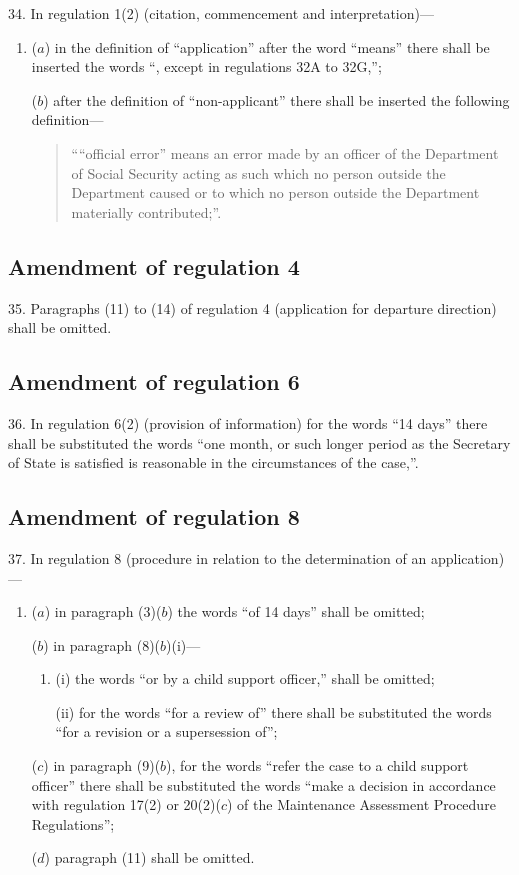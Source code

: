 \documentclass[12pt,a4paper]{article}
\begin{document}
34.  In regulation 1(2) (citation, commencement and interpretation)---
\begin{enumerate}\item[]
($a$) in the definition of “application” after the word “means” there shall be inserted the words “, except in regulations 32A to 32G,”;

($b$) after the definition of “non-applicant” there shall be inserted the following definition---
\begin{quotation}
““official error” means an error made by an officer of the Department of Social Security acting as such which no person outside the Department caused or to which no person outside the Department materially contributed;”.
\end{quotation}
\end{enumerate}

\subsection[35. Amendment of regulation 4]{Amendment of regulation 4}

35.  Paragraphs (11) to (14) of regulation 4 (application for departure direction) shall be omitted.

\subsection[36. Amendment of regulation 6]{Amendment of regulation 6}

36.  In regulation 6(2) (provision of information) for the words “14 days” there shall be substituted the words “one month, or such longer period as the Secretary of State is satisfied is reasonable in the circumstances of the case,”.

\subsection[37. Amendment of regulation 8]{Amendment of regulation 8}

37.  In regulation 8 (procedure in relation to the determination of an application)---
\begin{enumerate}\item[]
($a$) in paragraph (3)($b$) the words “of 14 days” shall be omitted;

($b$) in paragraph (8)($b$)(i)---
\begin{enumerate}\item[]
(i) the words “or by a child support officer,” shall be omitted;

(ii) for the words “for a review of” there shall be substituted the words “for a revision or a supersession of”;
\end{enumerate}

($c$) in paragraph (9)($b$), for the words “refer the case to a child support officer” there shall be substituted the words “make a decision in accordance with regulation 17(2) or 20(2)($c$) of the Maintenance Assessment Procedure Regulations”;

($d$) paragraph (11) shall be omitted.
\end{enumerate}
\end{document}
